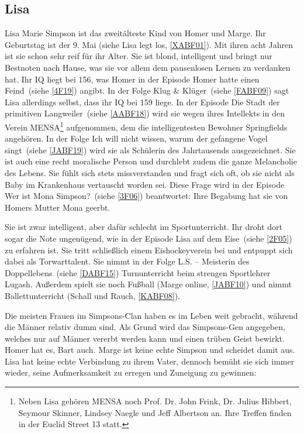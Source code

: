 \subsection{Lisa}\label{LisaSimpson}
Lisa Marie Simpson ist das zweitälteste Kind von Homer und Marge. Ihr Geburtstag ist der 9. Mai (siehe \glqq Lisa legt los\grqq, \ref{XABF01}). Mit ihren acht Jahren ist sie schon sehr reif für ihr Alter. Sie ist blond, intelligent und bringt nur Bestnoten nach Hause, was sie vor allem dem pausenlosen Lernen zu verdanken hat. Ihr IQ liegt bei 156, was Homer in der Episode \glqq Homer hatte einen Feind\grqq\ (siehe \ref{4F19}) angibt. In der Folge \glqq Klug \& Klüger\grqq\ (siehe \ref{FABF09}) sagt Lisa allerdings selbst, dass ihr IQ bei 159 liege. In der Episode \glqq Die Stadt der primitiven Langweiler\grqq\ (siehe \ref{AABF18}) wird sie wegen ihres Intellekts in den Verein MENSA\footnote{Neben Lisa gehören MENSA noch Prof. Dr. John Frink, Dr. Julius Hibbert, Seymour Skinner, Lindsey Naegle und Jeff Albertson an. Ihre Treffen finden in der Euclid Street 13 statt.} aufgenommen, dem die intelligentesten Bewohner Springfields angehören. In der Folge \glqq Ich will nicht wissen, warum der gefangene Vogel singt\grqq\ (siehe \ref{JABF19}) wird sie als Schülerin des Jahrtausends ausgezeichnet. Sie ist auch eine recht moralische Person und durchlebt zudem die ganze Melancholie des Lebens. Sie fühlt sich stets missverstanden und fragt sich oft, ob sie nicht als Baby im Krankenhaus vertauscht worden sei. Diese Frage wird in der Episode \glqq Wer ist Mona Simpson?\grqq\ (siehe \ref{3F06}) beantwortet: Ihre Begabung hat sie von Homers Mutter Mona geerbt.

Sie ist zwar intelligent, aber dafür schlecht im Sportunterricht. Ihr droht dort sogar die Note ungenügend, wie in der Episode \glqq Lisa auf dem Eise\grqq\ (siehe \ref{2F05}) zu erfahren ist. Sie tritt schließlich einem Eishockeyverein bei und entpuppt sich dabei als Torwarttalent. Sie nimmt in der Folge \glqq L.S. -- Meisterin des Doppellebens\grqq\ (siehe \ref{DABF15}) Turnunterricht beim strengen Sportlehrer Lugash. Außerdem spielt sie noch Fußball (\glqq Marge online\grqq , \ref{JABF10}) und nimmt Ballettunterricht (\glqq Schall und Rauch\grqq , \ref{KABF08}).

Die meisten Frauen im Simpsons-Clan haben es im Leben weit gebracht, wäh\-rend die Männer relativ dumm sind. Als Grund wird das Simpsons-Gen angegeben, welches nur auf Männer vererbt werden kann und einen trüben Geist bewirkt. Homer hat es, Bart auch. Marge ist keine echte Simpson und scheidet damit aus. Lisa hat keine echte Verbindung zu ihrem Vater, dennoch bemüht sie sich immer wieder, seine Aufmerksamkeit zu erregen und Zuneigung zu gewinnen:

